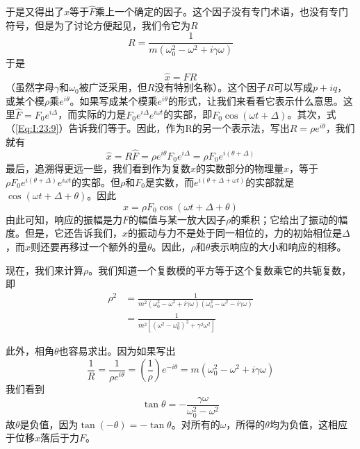 于是又得出了$\hat{x}$等于$\hat{F}$乘上一个确定的因子。这个因子没有专门术语，也没有专门符号，但是为了讨论方便起见，我们令它为$R$
\begin{equation*}
    R = \frac{1}{m(\omega_0^2 - \omega^2 + i\gamma\omega)}
\end{equation*}
于是
\begin{equation}
    \label{Eq:I:23:9}
    \hat{x} = \hat{F}R
\end{equation}
（虽然字母$\gamma$和$\omega_0$被广泛采用，但$R$没有特别名称）。这个因子$R$可以写成$p+iq$，或某个模$\rho$乘$e^{i\theta}$。如果写成某个模乘$e^{i\theta}$的形式，让我们来看看它表示什么意思。这里$\hat{F}=F_0e^{i\Delta}$，而实际的力是$F_0e^{i\Delta}e^{i\omega t}$的实部，即$F_0\cos(\omega t+\Delta)$。其次，式（\ref{Eq:I:23:9}）告诉我们等于。因此，作为R的另一个表示法，写出$R=\rho e^{i\theta}$，我们就有
\begin{equation*}
    \hat{x} = R\hat{F} = \rho e^{i\theta}F_0e^{i\Delta} = \rho F_0e^{i(\theta + \Delta)}
\end{equation*}
最后，追溯得更远一些，我们看到作为复数$\hat{x}$的实数部分的物理量$x$，等于$\rho F_0e^{i(\theta+\Delta)}e^{i\omega t}$的实部。但$\rho$和$F_0$是实数，而$e^{i(\theta+\Delta+\omega t)}$的实部就是$\cos(\omega t+\Delta+\theta)$。因此
\begin{equation}
    \label{Eq:I:23:10}
    x=\rho F_0 \cos(\omega t + \Delta + \theta)
\end{equation}
由此可知，响应的振幅是力$F$的幅值与某一放大因子$\rho$的乘积；它给出了振动的幅度。但是，它还告诉我们，$x$的振动与力不是处于同一相位的，力的初始相位是$\Delta$，而$x$则还要再移过一个额外的量$\theta$。因此，$\rho$和$\theta$表示响应的大小和响应的相移。

现在，我们来计算$\rho$。我们知道一个复数模的平方等于这个复数乘它的共轭复数，即
\begin{equation}
    \label{Eq:I:23:11}
    \begin{aligned}
        \rho^2 &= \frac{1}{m^2(\omega_0^2 - \omega^2 + i\gamma\omega)(\omega_0^2 - \omega^2 - i\gamma\omega)} \\
        &= \frac{1}{m^2[(\omega^2-\omega_0^2)^2 + \gamma^2\omega^2]}
    \end{aligned}
\end{equation}

此外，相角$\theta$也容易求出。因为如果写出
\begin{equation*}
    \frac{1}{R} = \frac{1}{\rho e^{i\theta}} = \left ( \frac{1}{\rho} \right ) e^{-i\theta} = m(\omega_0^2 - \omega^2 + i\gamma\omega)
\end{equation*}
我们看到
\begin{equation}
    \label{Eq:I:23:12}
    \tan \theta = -\frac{\gamma\omega}{\omega_0^2 - \omega^2}
\end{equation}
故$\theta$是负值，因为$\tan(-\theta)=-\tan\theta$。对所有的$\omega$，所得的$\theta$均为负值，这相应于位移$x$落后于力$F$。

